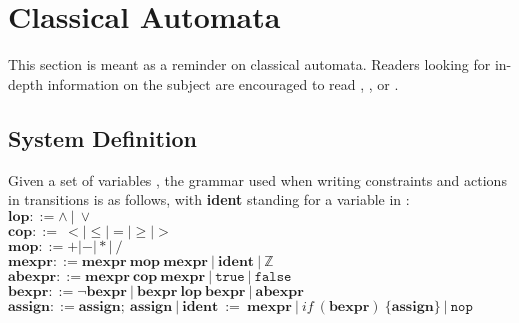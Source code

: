\section{Classical Automata}
This section is meant as a reminder on classical automata. Readers looking for
in-depth information on the subject are encouraged to read \cite{arnold},
\cite{hopcroft}, or \cite{Schnoebelen:10.5555/1965314}.

\subsection{System Definition}

\begin{definition}
\label{def:formal_methods:transition_grammar}
Given a set of variables \automatavariables{}, the grammar used when writing
constraints and actions in transitions is as follows, with \textbf{ident}
standing for a variable in \automatavariables{}:\\
$\textbf{lop} ::= \land~|~\lor $\\
$\textbf{cop} ::=\!\!\! ~< | \le | = | \ge | > $\\
$\textbf{mop} ::= + | - | * |~/$\\
$\textbf{mexpr} ::=
   \textbf{mexpr}~\textbf{mop}~\textbf{mexpr}
   ~|~ \textbf{ident}
   ~|~ \mathbb{Z}
$\\
$
\textbf{abexpr} ::=
   \textbf{mexpr}~\textbf{cop}~\textbf{mexpr}
   ~|~ \texttt{true}
   ~|~ \texttt{false}
$\\
$
\textbf{bexpr} ::=
   \neg \textbf{bexpr}
   ~|~ \textbf{bexpr}~\textbf{lop}~\textbf{bexpr}
   ~|~ \textbf{abexpr}
$\\
$
\textbf{assign} ::=
   \textbf{assign};~\textbf{assign}
   ~|~ \textbf{ident}~:=~\textbf{mexpr}
   ~|~ if~(\textbf{bexpr})~\{\textbf{assign}\}
   ~|~ \texttt{nop}
$
\end{definition}

